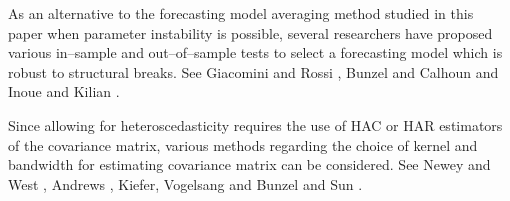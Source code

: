 As an alternative to the forecasting model averaging method studied in this paper when parameter instability is possible, several researchers have proposed various in--sample and out--of--sample tests to select a forecasting model which is robust to structural breaks. See Giacomini and Rossi \cite{giacomini_rossi_2008} \cite{giacomini_rossi_2010}, Bunzel and Calhoun \cite{bunzel_calhoun_2012} and Inoue and Kilian \cite{inoue_kilian_ER2004}.

Since allowing for heteroscedasticity requires the use of HAC or HAR estimators of the covariance matrix, various methods regarding the choice of kernel and bandwidth for estimating covariance matrix can be considered. See Newey and West \cite{newey_west_EMETRICA1987}, Andrews \cite{andrews91}, Kiefer, Vogelsang and Bunzel \cite{kvb2000} and Sun \cite{sunyixiao_2010}. 
